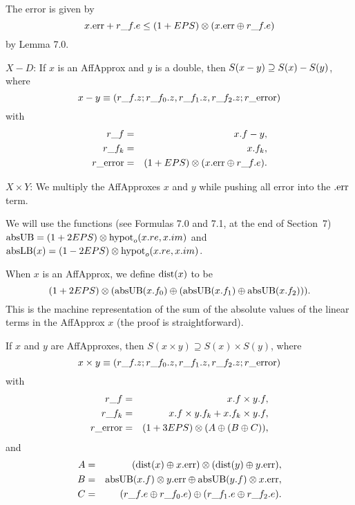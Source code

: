 The error is given by 
$$x.{\rm err} + r\_f.e \le (1 + EPS) \otimes (x.{\rm err} \oplus r\_f.e)$$
by Lemma 7.0. \enddemo

$X - D$:
\hskip-8pt If $x$ is an 
{\rm AffApprox}  and $y$ is a double{\rm ,}
then $S(x - y) \break\supseteq S(x) - S(y)${\rm ,} where
$$x - y \equiv (r\_f.z; r\_f_0.z, r\_f_1.z, r\_f_2.z; r\_{\rm error})$$
with
\begin{eqnarray*}
r\_f &= &x.f - y,\\
r\_f_k &=& x.f_k,\\
r\_{\rm error}& =& (1 + EPS) \otimes (x.{\rm err} \oplus r\_f.e).\end{eqnarray*}
\endproclaim

$X \times Y$: 
We multiply the AffApproxes $x$ and $y$ while pushing all error into the $.{\rm err}$ term.

We will use the functions (see Formulas 7.0 and 7.1, at the end of Section~7) ${\rm absUB}= (1 + 2EPS) \otimes
{\rm hypot}_o(x.re,x.im)$ and 
${\rm absLB}(x) = (1 - 2EPS) \otimes {\rm hypot}_o(x.re,x.im)$.

When $x$ is an AffApprox, we define ${\rm dist}(x)$ to be $$(1 + 2EPS) \otimes ({\rm absUB}(x.f_0) \oplus ({\rm absUB}(x.f_1) \oplus {\rm absUB}(x.f_2))).$$  This is the machine representation of the sum of the absolute values of the linear terms in the AffApprox $x$ 
(the proof is straightforward).

 If $x$ and $y$ are 
{\rm AffApproxes,}
then $S(x \times y) \supseteq S(x) \times S(y)${\rm ,} where
$$x \times y \equiv (r\_f.z; r\_f_0.z, r\_f_1.z, r\_f_2.z; r\_{\rm error})$$
with
\begin{eqnarray*}
r\_f &=& x.f \times y.f,\\
r\_f_k &=& x.f \times y.f_k + x.f_k \times y.f,\\
r\_{\rm error} &=& 
(1 + 3EPS) \otimes (A \oplus (B \oplus C)),\end{eqnarray*}
and
\begin{eqnarray*}
A &=& ({\rm dist}(x) \oplus x.{\rm err})\otimes ({\rm dist}(y) \oplus y.{\rm err}),
\\
B& =& {\rm absUB}(x.f) \otimes
y.{\rm err} \oplus {\rm absUB}(y.f) \otimes x.{\rm err},\\
C& =& (r\_f.e \oplus r\_f_0.e) \oplus (r\_f_1.e \oplus
r\_f_2.e).\end{eqnarray*}
\endproclaim

